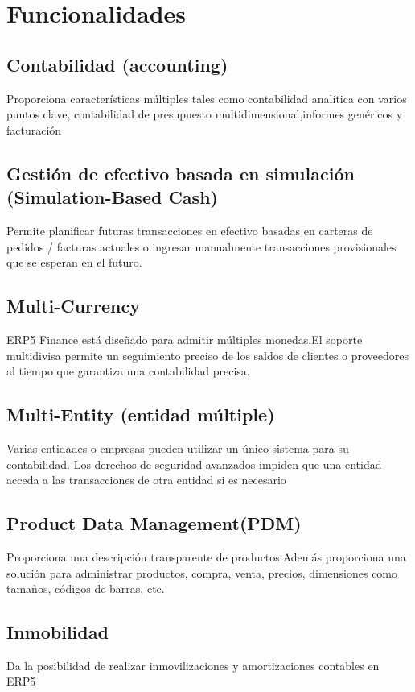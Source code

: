 \chapter{Funcionalidades}
\section{Contabilidad (accounting)}
Proporciona características múltiples tales como contabilidad analítica con varios puntos clave, contabilidad de presupuesto multidimensional,informes genéricos y facturación

\section{Gestión de efectivo basada en simulación (Simulation-Based Cash)}
Permite planificar futuras transacciones en efectivo basadas en carteras de pedidos / facturas actuales o ingresar manualmente transacciones provisionales que se esperan en el futuro.

\section{Multi-Currency}
ERP5 Finance está diseñado para admitir múltiples monedas.El soporte multidivisa permite un seguimiento preciso de los saldos de clientes o proveedores al tiempo que garantiza una contabilidad precisa.

\section{Multi-Entity (entidad múltiple)}
Varias entidades o empresas pueden utilizar un único sistema para su contabilidad. Los derechos de seguridad avanzados impiden que una entidad acceda a las transacciones de otra entidad si es necesario

\section{Product Data Management(PDM)}
Proporciona una descripción transparente de productos.Además proporciona una solución para administrar productos, compra, venta, precios, dimensiones como tamaños, códigos de barras, etc.

\section{Inmobilidad}
Da la posibilidad de realizar inmovilizaciones y amortizaciones contables en ERP5

